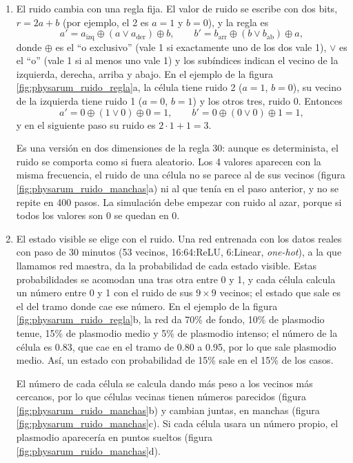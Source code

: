 \begin{enumerate}
	\item El ruido cambia con una regla fija. El valor de ruido se escribe con dos bits, $r = 2a + b$ (por ejemplo, el 2 es $a = 1$ y $b = 0$), y la regla es
	\[
		a' = a_{\text{izq}} \oplus (a \lor a_{\text{der}}) \oplus b, \qquad b' = b_{\text{arr}} \oplus (b \lor b_{\text{ab}}) \oplus a,
	\]
	donde $\oplus$ es el ``o exclusivo'' (vale 1 si exactamente uno de los dos vale 1), $\lor$ es el ``o'' (vale 1 si al menos uno vale 1) y los subíndices indican el vecino de la izquierda, derecha, arriba y abajo. En el ejemplo de la figura \ref{fig:physarum_ruido_regla}a, la célula tiene ruido 2 ($a = 1$, $b = 0$), su vecino de la izquierda tiene ruido 1 ($a = 0$, $b = 1$) y los otros tres, ruido 0. Entonces
	\[
		a' = 0 \oplus (1 \lor 0) \oplus 0 = 1, \qquad b' = 0 \oplus (0 \lor 0) \oplus 1 = 1,
	\]
	y en el siguiente paso su ruido es $2 \cdot 1 + 1 = 3$.

	Es una versión en dos dimensiones de la regla 30: aunque es determinista, el ruido se comporta como si fuera aleatorio. Los 4 valores aparecen con la misma frecuencia, el ruido de una célula no se parece al de sus vecinos (figura \ref{fig:physarum_ruido_manchas}a) ni al que tenía en el paso anterior, y no se repite en 400 pasos. La simulación debe empezar con ruido al azar, porque si todos los valores son 0 se quedan en 0.

	\item El estado visible se elige con el ruido. Una red entrenada con los datos reales con paso de 30 minutos (53 vecinos, 16:64:ReLU, 6:Linear, \textit{one-hot}), a la que llamamos red maestra, da la probabilidad de cada estado visible. Estas probabilidades se acomodan una tras otra entre 0 y 1, y cada célula calcula un número entre 0 y 1 con el ruido de sus $9 \times 9$ vecinos; el estado que sale es el del tramo donde cae ese número. En el ejemplo de la figura \ref{fig:physarum_ruido_regla}b, la red da 70\% de fondo, 10\% de plasmodio tenue, 15\% de plasmodio medio y 5\% de plasmodio intenso; el número de la célula es 0.83, que cae en el tramo de 0.80 a 0.95, por lo que sale plasmodio medio. Así, un estado con probabilidad de 15\% sale en el 15\% de los casos.

	El número de cada célula se calcula dando más peso a los vecinos más cercanos, por lo que células vecinas tienen números parecidos (figura \ref{fig:physarum_ruido_manchas}b) y cambian juntas, en manchas (figura \ref{fig:physarum_ruido_manchas}c). Si cada célula usara un número propio, el plasmodio aparecería en puntos sueltos (figura \ref{fig:physarum_ruido_manchas}d).
\end{enumerate}

